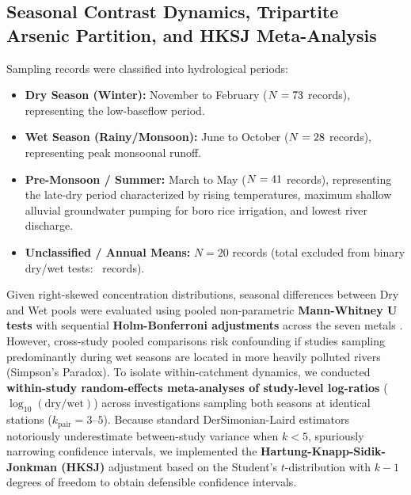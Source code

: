 \documentclass[authoryear,preprint,12pt]{elsarticle}
\begin{document}
\subsection{Seasonal Contrast Dynamics, Tripartite Arsenic Partition, and HKSJ Meta-Analysis}
Sampling records were classified into hydrological periods:
\begin{itemize}
    \item \textbf{Dry Season (Winter):} November to February ($N=73$ records), representing the low-baseflow period.
    \item \textbf{Wet Season (Rainy/Monsoon):} June to October ($N=28$ records), representing peak monsoonal runoff.
    \item \textbf{Pre-Monsoon / Summer:} March to May ($N=41$ records), representing the late-dry period characterized by rising temperatures, maximum shallow alluvial groundwater pumping for boro rice irrigation, and lowest river discharge.
    \item \textbf{Unclassified / Annual Means:} $N=20$ records (total excluded from binary dry/wet tests: \ExcludedSeasonRecords\ records).
\end{itemize}

Given right-skewed concentration distributions, seasonal differences between Dry and Wet pools were evaluated using pooled non-parametric \textbf{Mann-Whitney U tests} with sequential \textbf{Holm-Bonferroni adjustments} across the seven metals \citep{Holm1979}. However, cross-study pooled comparisons risk confounding if studies sampling predominantly during wet seasons are located in more heavily polluted rivers (Simpson's Paradox). To isolate within-catchment dynamics, we conducted \textbf{within-study random-effects meta-analyses of study-level log-ratios} ($\log_{10}(\text{dry} / \text{wet})$) across investigations sampling both seasons at identical stations ($k_{\mathrm{pair}} = 3$--$5$). Because standard DerSimonian-Laird estimators notoriously underestimate between-study variance when $k < 5$, spuriously narrowing confidence intervals, we implemented the \textbf{Hartung-Knapp-Sidik-Jonkman (HKSJ)} adjustment based on the Student's $t$-distribution with $k-1$ degrees of freedom to obtain defensible confidence intervals.
\end{document}
